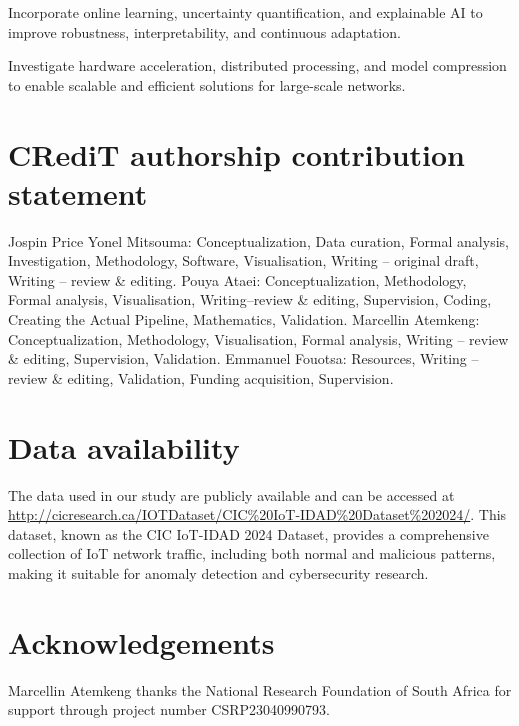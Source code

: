 \documentclass[preprint,12pt,authoryear]{elsarticle}
\begin{document}
\noindent Incorporate online learning, uncertainty quantification, and explainable AI to improve robustness, interpretability, and continuous adaptation.
    
\noindent Investigate hardware acceleration, distributed processing, and model compression to enable scalable and efficient solutions for large-scale networks.

\section{CRediT authorship contribution statement}

\noindent Jospin Price Yonel Mitsouma: Conceptualization, Data curation, Formal analysis, Investigation, Methodology, Software, Visualisation, Writing – original draft, Writing – review \& editing. Pouya Ataei: Conceptualization, Methodology, Formal analysis, Visualisation, Writing–review \& editing, Supervision, Coding, Creating the Actual Pipeline, Mathematics, Validation. Marcellin Atemkeng: Conceptualization, Methodology, Visualisation, Formal analysis, Writing – review \& editing, Supervision, Validation.  Emmanuel Fouotsa: Resources, Writing – review \& editing, Validation, Funding acquisition, Supervision.

\section{Data availability}
\noindent The data used in our study are publicly available and can be accessed at \url{http://cicresearch.ca/IOTDataset/CIC%20IoT-IDAD%20Dataset%202024/}. This dataset, known as the CIC IoT-IDAD 2024 Dataset, provides a comprehensive collection of IoT network traffic, including both normal and malicious patterns, making it suitable for anomaly detection and cybersecurity research.



\section{Acknowledgements}
\noindent Marcellin Atemkeng thanks the National Research Foundation of South Africa for support through project number CSRP23040990793.



\end{document}
